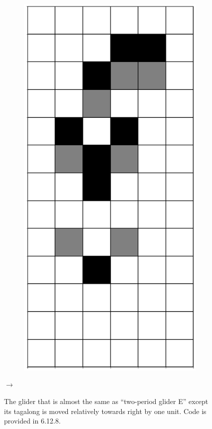 \documentclass[12pt]{article}
\numberwithin{figure}{section} %
\begin{document}
\begin{figure}[H]
\begin{subfigure}{0.3\textwidth}
     \subcaption{}
   \end{subfigure}
        \begin{subfigure}{0.3\textwidth}
     \centering
     \includegraphics[angle=270,width=\linewidth]{Section4/9.2}
     \subcaption{}
   \end{subfigure}
   {\LARGE$\xrightarrow{}$}
   \setcounter{subfigure}{0}
   \caption{The glider that is almost the same as “two-period glider E” except its tagalong is moved relatively towards right by one unit. Code is provided in 6.12.8. }
      \vspace{-1.5em}
\end{figure}
\end{document}
